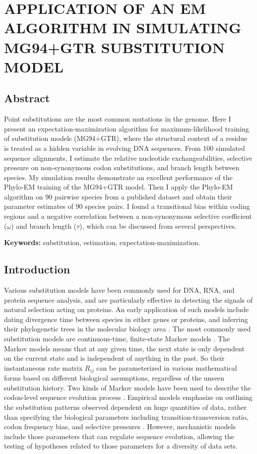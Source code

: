 \chapter{\normalfont APPLICATION OF AN EM ALGORITHM IN SIMULATING MG94+GTR SUBSTITUTION MODEL}
\label{ch:phyloEM}





\section{Abstract}
Point substitutions are the most common mutations in the genome. Here I present an expectation-maximization algorithm for maximum-likelihood training of substitution models (MG94+GTR), where the structural context of a residue is treated as a hidden variable in evolving DNA sequences. From 100 simulated sequence alignments, I estimate the relative nucleotide exchangeabilities, selective pressure on non-synonymous codon substitutions, and branch length between species. My simulation results demonstrate an excellent performance of the Phylo-EM training of the MG94+GTR model. Then I apply the Phylo-EM algorithm on 90 pairwise species from a published dataset and obtain their parameter estimates of 90 species pairs. I found a transitional bias within coding regions and a negative correlation between a non-synonymous selective coefficient ($\omega$) and branch length ($\tau$), which can be discussed from several perspectives.   

\noindent\textbf{Keywords:} substitution, estimation, expectation-maximization. 


\section{Introduction}
Various substitution models have been commonly used for DNA, RNA, and protein sequence analysis, and are particularly effective in detecting the signals of natural selection acting on proteins. An early application of such models include dating divergence time between species in either genes or proteins, and inferring their phylogenetic trees in the molecular biology area \parencite{felsenstein1981evolutionary}. The most commonly used substitution models are continuous-time, finite-state Markov models \parencite{karlin2014first}. The Markov models means that at any given time, the next state is only dependent on the current state and is independent of anything in the past. So their instantaneous rate matrix $R_{ij}$ can be parameterized in various mathematical forms based on different biological assumptions, regardless of the unseen substitution history. Two kinds of Markov models have been used to describe the codon-level sequence evolution process \parencite{kosiol2007empirical}. Empirical models emphasize on outlining the substitution patterns observed dependent on huge quantities of data, rather than specifying the biological parameters including transition-transversion ratio, codon frequency bias, and selective pressures \parencite{lio1998models}. However, mechanistic models include those parameters that can regulate sequence evolution, allowing the testing of hypotheses related to those parameters for a diversity of data sets.  

